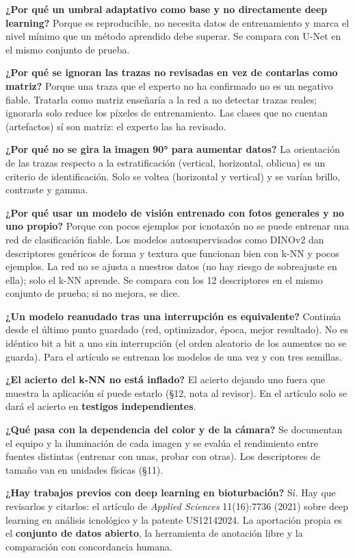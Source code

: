 \documentclass[
  10pt,
]{article}
\begin{document}
\textbf{¿Por qué un umbral adaptativo como base y no directamente deep
learning?} Porque es reproducible, no necesita datos de entrenamiento y
marca el nivel mínimo que un método aprendido debe superar. Se compara
con U-Net en el mismo conjunto de prueba.

\textbf{¿Por qué se ignoran las trazas no revisadas en vez de contarlas
como matriz?} Porque una traza que el experto no ha confirmado no es un
negativo fiable. Tratarla como matriz enseñaría a la red a no detectar
trazas reales; ignorarla solo reduce los píxeles de entrenamiento. Las
clases que no cuentan (artefactos) sí son matriz: el experto las ha
revisado.

\textbf{¿Por qué no se gira la imagen 90° para aumentar datos?} La
orientación de las trazas respecto a la estratificación (vertical,
horizontal, oblicua) es un criterio de identificación. Solo se voltea
(horizontal y vertical) y se varían brillo, contraste y gamma.

\textbf{¿Por qué usar un modelo de visión entrenado con fotos generales
y no uno propio?} Porque con pocos ejemplos por icnotaxón no se puede
entrenar una red de clasificación fiable. Los modelos autosupervisados
como DINOv2 dan descriptores genéricos de forma y textura que funcionan
bien con k-NN y pocos ejemplos. La red no se ajusta a nuestros datos (no
hay riesgo de sobreajuste en ella); solo el k-NN aprende. Se compara con
los 12 descriptores en el mismo conjunto de prueba; si no mejora, se
dice.

\textbf{¿Un modelo reanudado tras una interrupción es equivalente?}
Continúa desde el último punto guardado (red, optimizador, época, mejor
resultado). No es idéntico bit a bit a uno sin interrupción (el orden
aleatorio de los aumentos no se guarda). Para el artículo se entrenan
los modelos de una vez y con tres semillas.

\textbf{¿El acierto del k-NN no está inflado?} El acierto dejando uno
fuera que muestra la aplicación sí puede estarlo (§12, nota al revisor).
En el artículo solo se dará el acierto en \textbf{testigos
independientes}.

\textbf{¿Qué pasa con la dependencia del color y de la cámara?} Se
documentan el equipo y la iluminación de cada imagen y se evalúa el
rendimiento entre fuentes distintas (entrenar con unas, probar con
otras). Los descriptores de tamaño van en unidades físicas (§11).

\textbf{¿Hay trabajos previos con deep learning en bioturbación?} Sí.
Hay que revisarlos y citarlos: el artículo de \emph{Applied Sciences}
11(16):7736 (2021) sobre deep learning en análisis icnológico y la
patente US12142024. La aportación propia es el \textbf{conjunto de datos
abierto}, la herramienta de anotación libre y la comparación con
concordancia humana.
\end{document}
